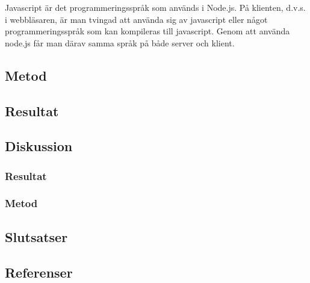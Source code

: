 Javascript är det programmeringsspråk som används i Node.js. På klienten, d.v.s. i webbläsaren, är man tvingad att använda sig av javascript eller något programmeringsspråk som kan kompileras till javascript. Genom att använda node.js får man därav samma språk på både server och klient. \\
\subsection{Metod}

\subsection{Resultat}
\subsection{Diskussion}
\subsubsection{Resultat}
\subsubsection{Metod}
\subsection{Slutsatser}
\subsection{Referenser}
\vspace{-9mm}
\begin{thebibliography}{9}

\end{thebibliography}
